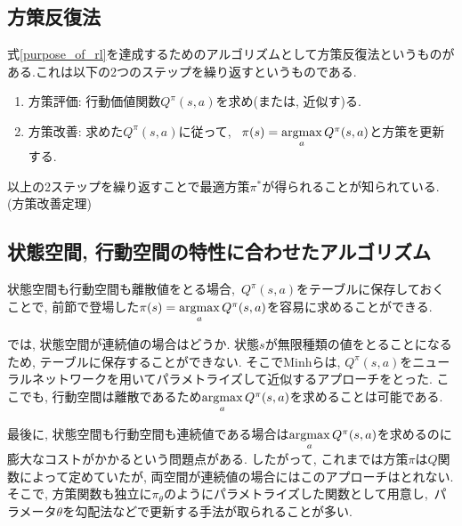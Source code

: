 \documentclass[dvipdfmx]{ampmt}
\newcommand{\argmax}{\mathop{\rm argmax}\limits}
\begin{document}
\subsection{方策反復法}
式\eqref{purpose_of_rl}を達成するためのアルゴリズムとして方策反復法というものがある.これは以下の2つのステップを繰り返すというものである.
\begin{enumerate}
	\item 方策評価: 行動価値関数$Q^{\pi}(s,a)$を求め(または, 近似す)る.
	\item 方策改善: 求めた$Q^{\pi}(s,a)$に従って, ~$\pi(s)=\argmax_aQ^{\pi}(s,a)$と方策を更新する.
\end{enumerate}
以上の2ステップを繰り返すことで最適方策$\pi^{*}$が得られることが知られている.(方策改善定理)

\subsection{状態空間, 行動空間の特性に合わせたアルゴリズム}
\label{sec:policy_improvement}
状態空間も行動空間も離散値をとる場合,~$Q^{\pi}(s,a)$をテーブルに保存しておくことで, 前節で登場した$\pi(s)=\argmax_aQ^{\pi}(s,a)$を容易に求めることができる.\par
では, 状態空間が連続値の場合はどうか. 状態$s$が無限種類の値をとることになるため, テーブルに保存することができない. そこでMinhら\cite{DQN}は, $Q^{\pi}(s,a)$をニューラルネットワークを用いてパラメトライズして近似するアプローチをとった. ここでも, 行動空間は離散であるため$\argmax_aQ^{\pi}(s,a)$を求めることは可能である.\par
最後に, 状態空間も行動空間も連続値である場合は$\argmax_aQ^{\pi}(s,a)$を求めるのに膨大なコストがかかるという問題点がある. したがって, これまでは方策$\pi$は$Q$関数によって定めていたが, 両空間が連続値の場合にはこのアプローチはとれない. そこで, 方策関数も独立に$\pi_{\theta}$のようにパラメトライズした関数として用意し,~パラメータ$\theta$を勾配法などで更新する手法が取られることが多い.
\end{document}
